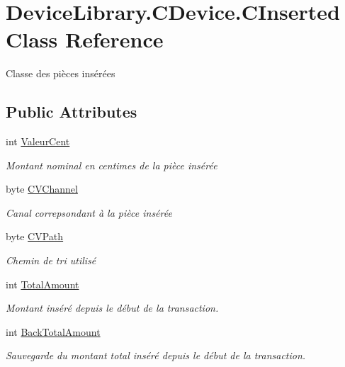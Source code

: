 \hypertarget{class_device_library_1_1_c_device_1_1_c_inserted}{}\section{Device\+Library.\+C\+Device.\+C\+Inserted Class Reference}
\label{class_device_library_1_1_c_device_1_1_c_inserted}


Classe des pièces insérées  


\subsection*{Public Attributes}
\begin{DoxyCompactItemize}
\item 
int \mbox{\hyperlink{class_device_library_1_1_c_device_1_1_c_inserted_ab9c8961b8a31a68caeb666da2763b167}{Valeur\+Cent}}
\begin{DoxyCompactList}\small\item\em Montant nominal en centimes de la pièce insérée \end{DoxyCompactList}\item 
byte \mbox{\hyperlink{class_device_library_1_1_c_device_1_1_c_inserted_a16ccb19a7c0e506b326db99edcb09e01}{C\+V\+Channel}}
\begin{DoxyCompactList}\small\item\em Canal correpsondant à la pièce insérée \end{DoxyCompactList}\item 
byte \mbox{\hyperlink{class_device_library_1_1_c_device_1_1_c_inserted_a66163183a1fdfe890af777cb3560b288}{C\+V\+Path}}
\begin{DoxyCompactList}\small\item\em Chemin de tri utilisé \end{DoxyCompactList}\item 
int \mbox{\hyperlink{class_device_library_1_1_c_device_1_1_c_inserted_af8489940b66b948f63c38c86051416be}{Total\+Amount}}
\begin{DoxyCompactList}\small\item\em Montant inséré depuis le début de la transaction. \end{DoxyCompactList}\item 
int \mbox{\hyperlink{class_device_library_1_1_c_device_1_1_c_inserted_abf2e8e8167ae9f39731fc7d74f48db48}{Back\+Total\+Amount}}
\begin{DoxyCompactList}\small\item\em Sauvegarde du montant total inséré depuis le début de la transaction. \end{DoxyCompactList}\end{DoxyCompactItemize}


